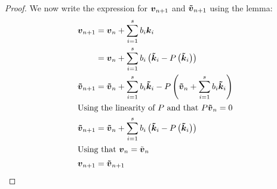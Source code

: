 \begin{proof}
We now write the expression for ${\boldsymbol {v}}_{n+1}$ and ${\boldsymbol {\tilde{v}}}_{n+1}$ using the lemma:
\begin{align*}
{\boldsymbol {v}}_{n+1}&={\boldsymbol {v}}_{n}+\sum_{i=1}^{s}b_{i}{\boldsymbol {k}}_{i}\\
&={\boldsymbol {v}}_{n}+\sum_{i=1}^{s}b_{i}\left({\boldsymbol {\tilde{k}}}_{i}-P\left({\boldsymbol {\tilde{k}}}_{i}\right)\right)\\
{\boldsymbol {\tilde{v}}}_{n+1}&={\boldsymbol {\tilde{v}}}_{n}+\sum_{i=1}^{s}b_{i}{\boldsymbol {\tilde{k}}}_{i}-P\left({\boldsymbol {\tilde{v}}}_{n}+\sum_{i=1}^{s}b_{i}{\boldsymbol {\tilde{k}}}_{i}\right)\\
\intertext{Using the linearity of $P$ and that $P{\boldsymbol {\tilde{v}}}_{n}=0$}
{\boldsymbol {\tilde{v}}}_{n+1}&={\boldsymbol {\tilde{v}}}_{n}+\sum_{i=1}^{s}b_{i}\left({\boldsymbol {\tilde{k}}}_{i}-P\left({\boldsymbol {\tilde{k}}}_{i}\right)\right)\\
\intertext{Using that ${\boldsymbol {v}}_{n}=\tilde{{\boldsymbol {v}}}_{n}$}
{\boldsymbol {v}}_{n+1}&={\boldsymbol {\tilde{v}}}_{n+1}
\end{align*}

\end{proof}

